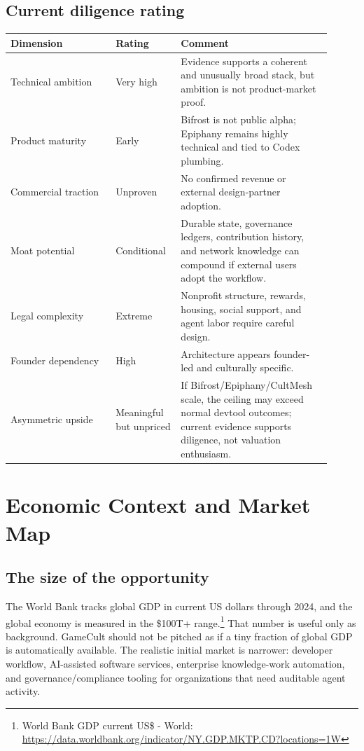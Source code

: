\documentclass[11pt,oneside]{report}
\newcommand{\src}[2]{\footnote{#1: \url{#2}}}
\begin{document}
\section{Current diligence rating}

\begin{longtable}{P{0.3\linewidth}P{0.18\linewidth}P{0.43\linewidth}}
\toprule
\textbf{Dimension} & \textbf{Rating} & \textbf{Comment} \\
\midrule
Technical ambition & Very high & Evidence supports a coherent and unusually broad stack, but ambition is not product-market proof. \\
Product maturity & Early & Bifrost is not public alpha; Epiphany remains highly technical and tied to Codex plumbing. \\
Commercial traction & Unproven & No confirmed revenue or external design-partner adoption. \\
Moat potential & Conditional & Durable state, governance ledgers, contribution history, and network knowledge can compound if external users adopt the workflow. \\
Legal complexity & Extreme & Nonprofit structure, rewards, housing, social support, and agent labor require careful design. \\
Founder dependency & High & Architecture appears founder-led and culturally specific. \\
Asymmetric upside & Meaningful but unpriced & If Bifrost/Epiphany/CultMesh scale, the ceiling may exceed normal devtool outcomes; current evidence supports diligence, not valuation enthusiasm. \\
\bottomrule
\end{longtable}

\chapter{Economic Context and Market Map}

\section{The size of the opportunity}

The World Bank tracks global GDP in current US dollars through 2024, and the global economy is measured in the \$100T+ range.\src{World Bank GDP current US\$ - World}{https://data.worldbank.org/indicator/NY.GDP.MKTP.CD?locations=1W} That number is useful only as background. GameCult should not be pitched as if a tiny fraction of global GDP is automatically available. The realistic initial market is narrower: developer workflow, AI-assisted software services, enterprise knowledge-work automation, and governance/compliance tooling for organizations that need auditable agent activity.
\end{document}
